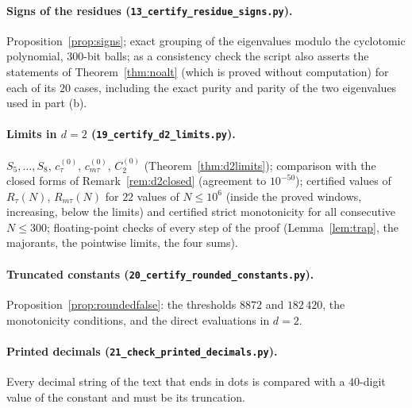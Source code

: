 \documentclass[11pt,a4paper]{article}
\theoremstyle{plain}
\theoremstyle{definition}
\numberwithin{equation}{section}
\begin{document}
\paragraph{Signs of the residues (\texttt{13\_certify\_residue\_signs.py}).} Proposition~\ref{prop:signs}; exact grouping of the eigenvalues modulo the cyclotomic polynomial, $300$-bit balls; as a consistency check the script also asserts the statements of Theorem~\ref{thm:noalt} (which is proved without computation) for each of its $20$ cases, including the exact purity and parity of the two eigenvalues used in part (b).

\paragraph{Limits in $d=2$ (\texttt{19\_certify\_d2\_limits.py}).} $S_5,\dots,S_8$, $c^{(0)}_\tau$, $c^{(0)}_{m\tau}$, $C_2^{(0)}$ (Theorem~\ref{thm:d2limits}); comparison with the closed forms of Remark~\ref{rem:d2closed} (agreement to $10^{-50}$); certified values of $R_\tau(N)$, $R_{m\tau}(N)$ for $22$ values of $N\le10^6$ (inside the proved windows, increasing, below the limits) and certified strict monotonicity for all consecutive $N\le300$; floating-point checks of every step of the proof (Lemma~\ref{lem:trap}, the majorants, the pointwise limits, the four sums).

\paragraph{Truncated constants (\texttt{20\_certify\_rounded\_constants.py}).} Proposition~\ref{prop:roundedfalse}: the thresholds $8872$ and $182\,420$, the monotonicity conditions, and the direct evaluations in $d=2$.

\paragraph{Printed decimals (\texttt{21\_check\_printed\_decimals.py}).} Every decimal string of the text that ends in dots is compared with a $40$-digit value of the constant and must be its truncation.
\end{document}
